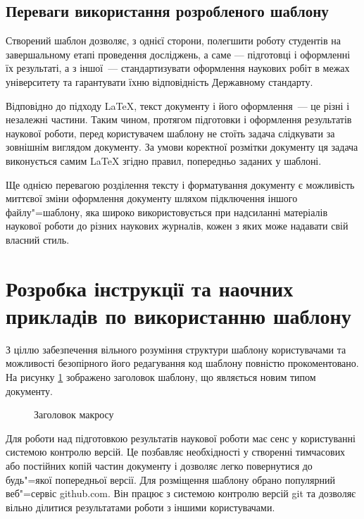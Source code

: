 \subsection{Переваги використання розробленого шаблону}

Створений шаблон дозволяє, з однієї сторони, полегшити роботу студентів на завершальному етапі проведення досліджень, а саме —  підготовці і оформленні їх результаті, а з іншої~--- стандартизувати оформлення наукових робіт в межах університету та гарантувати їхню відповідність Державному стандарту.

Відповідно до підходу \LaTeX{}, текст документу і його оформлення~--- це різні і незалежні частини. Таким чином, протягом підготовки і оформлення результатів наукової роботи, перед користувачем шаблону не стоїть задача слідкувати за зовнішнім виглядом документу. За умови коректної розмітки документу ця задача виконується самим \LaTeX{} згідно правил, попередньо заданих у шаблоні.

Ще однією перевагою розділення тексту і форматування документу є можливість миттєвої зміни оформлення документу шляхом підключення іншого файлу"=шаблону, яка широко використовується при надсиланні матеріалів наукової роботи до різних наукових журналів, кожен з яких може надавати свій власний стиль.

\section{Розробка інструкції та наочних прикладів по використанню шаблону}

З ціллю забезпечення вільного розуміння структури шаблону користувачами та можливості безопірного його редагування код шаблону повністю прокоментовано. На рисунку \ref{ris:tmpBegining} зображено заголовок шаблону, що являється новим типом документу.

\begin{figure}[h]
\caption{Заголовок макросу}
\label{ris:tmpBegining}
\end{figure}

Для роботи над підготовкою результатів наукової роботи має сенс у користуванні системою контролю версій. Це позбавляє необхідності у створенні тимчасових або постійних копій частин документу і дозволяє легко повернутися до будь"=якої попередньої версії. Для розміщення шаблону обрано популярний веб"=сервіс github.com. Він працює з системою контролю версій git та дозволяє вільно ділитися результатами роботи з іншими користувачами.